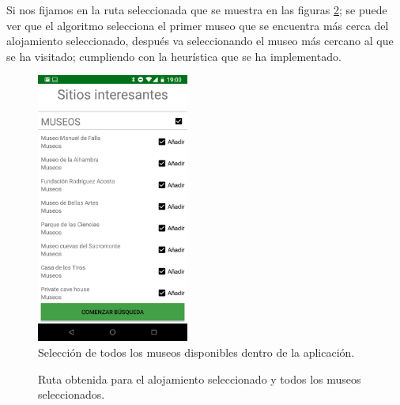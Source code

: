 Si nos fijamos en la ruta seleccionada que se muestra en las figuras \ref{fig:salida}; se puede ver que el algoritmo selecciona el primer museo que se encuentra más cerca del alojamiento seleccionado, después va seleccionando el museo más cercano al que se ha visitado; cumpliendo con la heurística que se ha implementado.
\begin{figure}[H]
	\centering
	\includegraphics[width=50mm]{imagenes/seleccion_museos}
	\caption{Selección de todos los museos disponibles dentro de la aplicación.}
	\label{fig:selec_museos}
\end{figure}
\begin{figure}[H]
	\centering
	\caption{Ruta obtenida para el alojamiento seleccionado y todos los museos seleccionados.}
	\label{fig:salida}
\end{figure}

